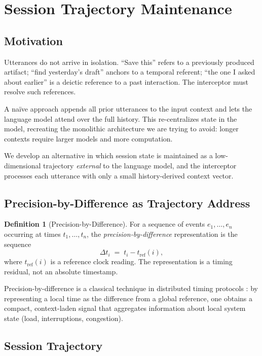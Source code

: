 \documentclass[11pt,twocolumn,a4paper]{article}
\theoremstyle{definition}
\newtheorem{definition}[theorem]{Definition}
\theoremstyle{remark}
\begin{document}
\section{Session Trajectory Maintenance}
\label{sec:session}

\subsection{Motivation}

Utterances do not arrive in isolation. ``Save this'' refers to a previously produced artifact; ``find yesterday's draft'' anchors to a temporal referent; ``the one I asked about earlier'' is a deictic reference to a past interaction. The interceptor must resolve such references.

A na\"{i}ve approach appends all prior utterances to the input context and lets the language model attend over the full history. This re-centralizes state in the model, recreating the monolithic architecture we are trying to avoid: longer contexts require larger models and more computation.

We develop an alternative in which session state is maintained as a low-dimensional trajectory \emph{external} to the language model, and the interceptor processes each utterance with only a small history-derived context vector.

\subsection{Precision-by-Difference as Trajectory Address}

\begin{definition}[Precision-by-Difference]
\label{def:pbd}
For a sequence of events $e_1, \ldots, e_n$ occurring at times $t_1, \ldots, t_n$, the \emph{precision-by-difference} representation is the sequence
\[
\Delta t_i \;=\; t_i - t_{\mathrm{ref}}(i),
\]
where $t_{\mathrm{ref}}(i)$ is a reference clock reading. The representation is a timing residual, not an absolute timestamp.
\end{definition}

Precision-by-difference is a classical technique in distributed timing protocols \citep{mills1991ntp}: by representing a local time as the difference from a global reference, one obtains a compact, context-laden signal that aggregates information about local system state (load, interruptions, congestion).

\subsection{Session Trajectory}
\end{document}
